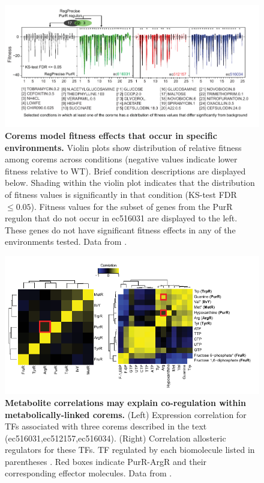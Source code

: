 \begin{figure}[h!]
\centering
\includegraphics[width=0.95\linewidth]{figures/purR_corem_fitness_specific.pdf}
\caption[Corems model fitness effects that occur in specific environments]{\textbf{Corems model fitness effects that occur in specific environments.} Violin plots show distribution of relative fitness among corems across conditions (negative values indicate lower fitness relative to WT). Brief condition descriptions are displayed below. Shading within the violin plot indicates that the distribution of fitness values is significantly in that condition (KS-test FDR $\leq 0.05$). Fitness values for the subset of genes from the PurR regulon that do not occur in ec516031 are displayed to the left. These genes do not have significant fitness effects in any of the environments tested. Data from \cite{Nichols2011}.}
\label{fig:purR_corem_fitness_specific}
\end{figure}

\begin{figure}[h!]
\centering
\includegraphics[width=0.95\linewidth]{figures/purR_effector.pdf}
\caption[Metabolite correlations may explain co-regulation within metabolically-linked corems]{\textbf{Metabolite correlations may explain co-regulation within metabolically-linked corems.} (Left) Expression correlation for TFs associated with three corems described in the text (ec516031,ec512157,ec516034). (Right) Correlation allosteric regulators for these TFs. TF regulated by each biomolecule listed in parentheses \cite{Novichkov2010}. Red boxes indicate PurR-ArgR and their corresponding effector molecules. Data from \cite{Ishii2007}.}
\label{fig:purR_effector}
\end{figure}

